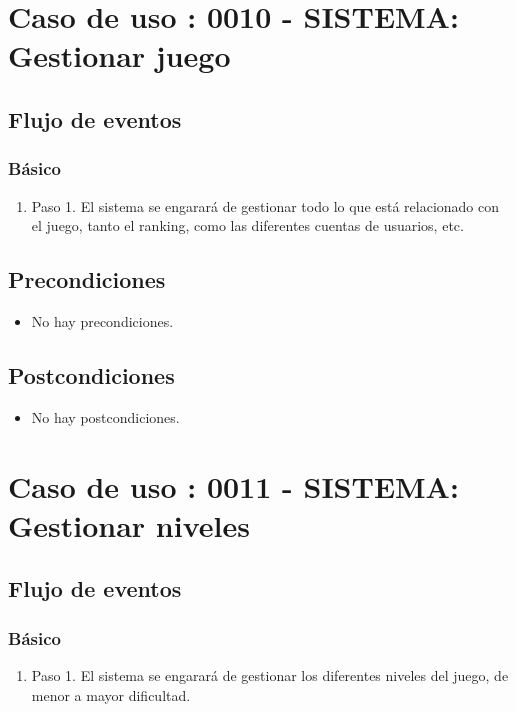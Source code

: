 \section{Caso de uso : 0010 - SISTEMA: Gestionar juego}\label{sec:uc0}
\subsection{Flujo de eventos}
\subsubsection{Básico}

\begin{enumerate}
\item Paso 1.
El sistema se engarará de gestionar todo lo que está relacionado con el juego, tanto el ranking, como las diferentes cuentas de usuarios, etc.
\end{enumerate}

\subsection{Precondiciones}
\begin{itemize}
\item No hay precondiciones.
\end{itemize}

\subsection{Postcondiciones}
\begin{itemize}
\item No hay postcondiciones.
\end{itemize}



\section{Caso de uso : 0011 - SISTEMA: Gestionar niveles}\label{sec:uc0}
\subsection{Flujo de eventos}
\subsubsection{Básico}

\begin{enumerate}
\item Paso 1.
El sistema se engarará de gestionar los diferentes niveles del juego, de menor a mayor dificultad.
\end{enumerate}

